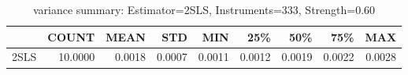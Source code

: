 \begin{table}[ht]
\centering
\caption{variance summary: Estimator=2SLS, Instruments=333, Strength=0.60}
\begin{tabular}{lrrrrrrrr}
\toprule
 & COUNT & MEAN & STD & MIN & 25\% & 50\% & 75\% & MAX \\
\midrule
2SLS & 10.0000 & 0.0018 & 0.0007 & 0.0011 & 0.0012 & 0.0019 & 0.0022 & 0.0028 \\
\bottomrule
\end{tabular}
\end{table}
